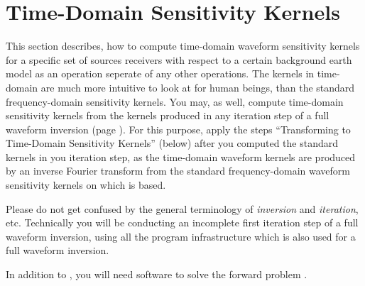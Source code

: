 \section*{Time-Domain Sensitivity Kernels} \label{guide,sec:time_kernels}
%
%
This section describes, how to compute time-domain waveform sensitivity kernels for a specific set 
of sources receivers with respect to a certain background earth model as an operation seperate of any
other \ASKI operations. The kernels in time-domain are much more intuitive to look at for human beings, 
than the standard frequency-domain sensitivity kernels. You may, as well, compute time-domain sensitivity 
kernels from the kernels produced in any iteration step of a full waveform inversion 
(page \pageref{guide,sec:classic_inversion}). For this purpose, apply the steps 
``Transforming to Time-Domain Sensitivity Kernels'' (below) after you computed the standard kernels in 
you iteration step, as the time-domain waveform kernels are produced by an inverse Fourier transform 
from the standard frequency-domain waveform sensitivity kernels on which \ASKI is based.

Please do not get confused by the general terminology of \emph{inversion} and \emph{iteration}, etc. 
Technically you will be conducting an incomplete first iteration step of a full waveform inversion, 
using all the program infrastructure which is also used for a full waveform inversion. 

In addition to \ASKI {}, you will need software to solve the forward 
problem .
%
